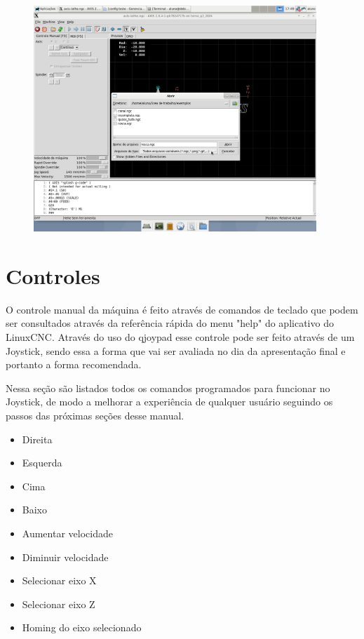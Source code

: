 \documentclass[twoside,a4paper]{refart}
\begin{document}
\begin{figure}[H]
    \begin{center}
        \includegraphics[width=0.95\textwidth]{imagens/Selecao_do_programa.png}
    \end{center}
    \caption{}\label{progselec2}
\end{figure}

\section{Controles}

O controle manual da máquina é feito através de comandos de teclado que podem ser consultados através da referência rápida do menu "help" do aplicativo do LinuxCNC. Através do uso do qjoypad esse controle pode ser feito através de um Joystick, sendo essa a forma que vai ser avaliada no dia da apresentação final e portanto a forma recomendada. 

Nessa seção são listados todos os comandos programados para funcionar no Joystick, de modo a melhorar a experiência de qualquer usuário seguindo os passos das próximas seções desse manual. 

\begin{itemize}
    \item Direita 
    \item Esquerda
    \item Cima
    \item Baixo
    \item Aumentar velocidade 
    \item Diminuir velocidade
    \item Selecionar eixo X
    \item Selecionar eixo Z
    \item Homing do eixo selecionado
\end{itemize}
\end{document}
